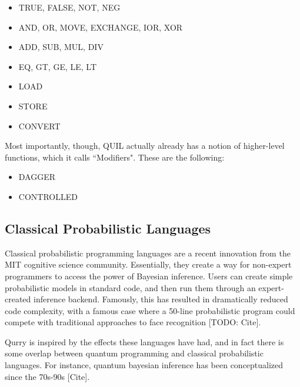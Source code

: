 \documentclass[a4paper,twocolumn,11pt,accepted=2017-05-09]{quantumarticle}
\begin{document}
\begin{itemize}
    \item TRUE, FALSE, NOT, NEG %
    \item AND, OR, MOVE, EXCHANGE, IOR, XOR %
    \item ADD, SUB, MUL, DIV %
    \item EQ, GT, GE, LE, LT %
    \item LOAD %
    \item STORE %
    \item CONVERT %
\end{itemize}

Most importantly, though, QUIL actually already has a notion of higher-level functions, which it calls ``Modifiers".
These are the following:
\begin{itemize}
    \item DAGGER
    \item CONTROLLED
\end{itemize}

\subsection{Classical Probabilistic Languages}

\cite{carpenter2017stan}
\cite{goodman2012church}

 Classical probabilistic programming languages are a recent innovation from the MIT cognitive science community. 
 Essentially, they create a way for non-expert programmers to access the power of Bayesian inference. 
 Users can create simple probabilistic models in standard code, and then run them through an expert-created inference backend.
 Famously, this has resulted in dramatically reduced code complexity, with a famous case where a 50-line probabilistic program could compete with traditional approaches to face recognition [TODO: Cite].

 Qurry is inspired by the effects these languages have had, and in fact there is some overlap between quantum programming and classical probabilistic languages.
 For instance, quantum bayesian inference has been conceptualized since the 70s-90s [Cite].
\end{document}
